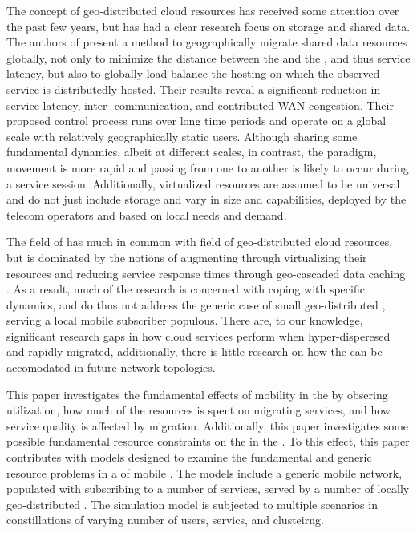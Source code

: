 The concept of geo-distributed cloud resources has received some attention over the past few years, but has had a clear research focus on storage and shared data. The authors of \cite{agarwal2010volley} present a method to geographically migrate shared data resources globally, not only to minimize the distance between the \ue{} and the \dc{}, and thus service latency, but also to globally load-balance the hosting \dcs{} on which the observed service is distributedly hosted. Their results reveal a significant reduction in service latency, inter-\dc{} communication, and contributed WAN congestion. Their proposed control process runs over long time periods and operate on a global scale with relatively geographically static users. Although sharing some fundamental dynamics, albeit at different scales, in contrast, the \xcloud{} paradigm, \ue{} movement is more rapid and passing from one \rbs to another is likely to occur during a service session. Additionally, \xcloud{} virtualized resources are assumed to be universal and do not just include storage and vary in size and capabilities, deployed by the telecom operators and based on local needs and demand.

The field of \xcloud{} has much in common with field of geo-distributed cloud resources, but is dominated by the notions of augmenting \ues{} through virtualizing their resources \cite{6563280} and reducing service response times through geo-cascaded data caching \cite{1437087,ericsson_akami}. As a result, much of the research is concerned with coping with specific dynamics, and do thus not address the generic case of small geo-distributed \dcs, serving a local mobile subscriber populous. There are, to our knowledge, significant research gaps in how cloud services perform when hyper-disperesed and rapidly migrated, additionally, there is little research on how the \xcloud can be accomodated in future network topologies.

This paper investigates the fundamental effects of \ue mobility in the \xcloud by obsering \dc utilization, how much of the \dcs resources is spent on migrating services, and how service quality is affected by migration. Additionally, this paper investigates some possible fundamental resource constraints on the \dcs in the \xcloud. To this effect, this paper contributes with models designed to examine the fundamental and generic resource problems in a \xcloud{} of mobile \ues{}. The models include a generic mobile network, populated with \ues{} subscribing to a number of services, served by a number of locally geo-distributed \dcs{}. The simulation model is subjected to multiple scenarios in constillations of varying number of users, servics, and \dc clusteirng.

